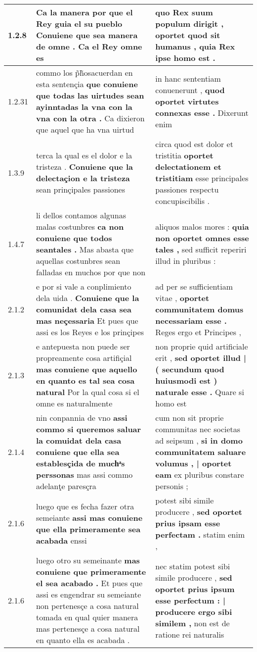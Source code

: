 \begin{tabular}{|p{1cm}|p{6.5cm}|p{6.5cm}|}
1.2.8 & Ca la manera por que el Rey guia el su pueblo \textbf{ Conuiene que sea manera de omne . } Ca el Rey omne es & quo Rex suum populum dirigit , \textbf{ oportet quod sit humanus , } quia Rex ipse homo est . \\\hline
1.2.31 & commo los p̃h̃osacuerdan en esta sentençia \textbf{ que conuiene que todas las uirtudes sean ayinntadas la vna con la vna con la otra . } Ca dixieron que aquel que ha vna uirtud & in hanc sententiam conuenerunt , \textbf{ quod oportet virtutes connexas esse . } Dixerunt enim \\\hline
1.3.9 & terca la qual es el dolor e la tristeza . \textbf{ Conuiene que la delectaçion e la tristeza } sean prinçipales passiones & circa quod est dolor et tristitia \textbf{ oportet delectationem et tristitiam } esse principales passiones respectu concupiscibilis . \\\hline
1.4.7 & li dellos contamos algunas malas costunbres \textbf{ ca non conuiene que todos seantales . } Mas abasta que aquellas costunbres sean falladas en muchos por que non & aliquos malos mores : \textbf{ quia non oportet omnes esse tales , } sed sufficit reperiri illud in pluribus : \\\hline
2.1.2 & e por si vale a conplimiento dela uida . \textbf{ Conuiene que la comunidat dela casa sea mas neçessaria } Et pues que assi es los Reyes e los prinçipes & ad per se sufficientiam vitae , \textbf{ oportet communitatem domus necessariam esse . } Reges ergo et Principes , \\\hline
2.1.3 & e antepuesta non puede ser propreamente cosa artifiçial \textbf{ mas conuiene que aquello en quanto es tal sea cosa natural } Por la qual cosa si el omne es naturalmente & non proprie quid artificiale erit , \textbf{ sed oportet illud | ( secundum quod huiusmodi est ) naturale esse . } Quare si homo est \\\hline
2.1.4 & nin conpannia de vno \textbf{ assi commo si queremos saluar la comuidat dela casa conuiene que ella sea establesçida de muchͣs perssonas } mas assi commo adelanţe paresçra & cum non sit proprie communitas nec societas ad seipsum , \textbf{ si in domo communitatem saluare volumus , | oportet eam } ex pluribus constare personis ; \\\hline
2.1.6 & luego que es fecha fazer otra semeiante \textbf{ assi mas conuiene que ella primeramente sea acabada } enssi & potest sibi simile producere , \textbf{ sed oportet prius ipsam esse perfectam . } statim enim , \\\hline
2.1.6 & luego otro su semeinante \textbf{ mas conuiene que primeramente el sea acabado . } Et pues que assi es engendrar su semeiante non pertenesçe a cosa natural tomada en qual quier manera mas pertenesçe a cosa natural en quanto ella es acabada . & nec statim potest sibi simile producere , \textbf{ sed oportet prius ipsum esse perfectum : | producere ergo sibi similem , } non est de ratione rei naturalis \\\hline

\end{tabular}
